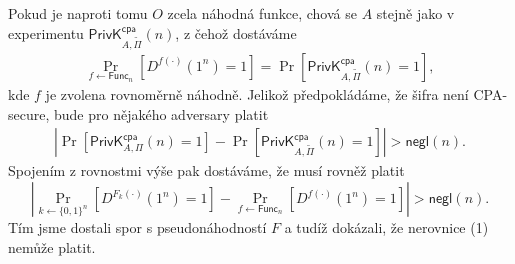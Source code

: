 \documentclass{scrartcl}
\DeclareMathOperator{\Prob}{\text{Pr}}
\begin{document}
Pokud je naproti tomu $O$ zcela náhodná funkce, chová se $A$ stejně jako v experimentu $\textsf{PrivK}^\textsf{cpa}_{A, \tilde{\Pi}}(n)$, z čehož dostáváme
\begin{align*}
    \Prob_{f \leftarrow \textsf{Func}_n} \left[ D^{f(\cdot)}(1^n) = 1 \right] = \Prob\left[ \textsf{PrivK}^\textsf{cpa}_{A, \tilde{\Pi}}(n) = 1 \right],
\end{align*}
kde $f$ je zvolena rovnoměrně náhodně. Jelikož předpokládáme, že šifra není CPA-secure, bude pro nějakého adversary platit 
\begin{align}
    \left\vert \Prob\left[ \textsf{PrivK}^\textsf{cpa}_{A, \Pi}(n) = 1 \right] - \Prob\left[ \textsf{PrivK}^\textsf{cpa}_{A, \tilde{\Pi}}(n) = 1 \right] \right\vert > \textsf{negl}(n).
\end{align}
Spojením z rovnostmi výše pak dostáváme, že musí rovněž platit
$$
    \left\vert  \Prob_{k\leftarrow \{0,1\}^n}\left[ D^{F_k(\cdot)}(1^n) = 1 \right] - \Prob_{f \leftarrow \textsf{Func}_n} \left[ D^{f(\cdot)}(1^n) = 1 \right] \right\vert > \textsf{negl}(n).
$$
Tím jsme dostali spor s pseudonáhodností $F$ a tudíž dokázali, že nerovnice (1) nemůže platit.
\end{document}
